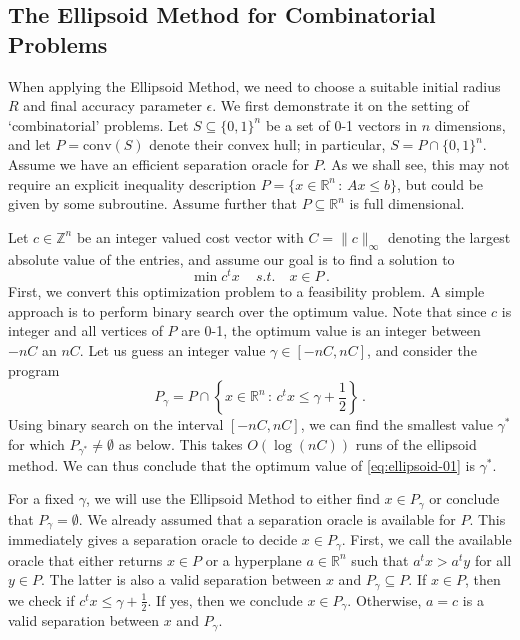 \documentclass[12pt, showidx, twoside]{article}
\def\R{\mathbb{R}}
\begin{document}
{{{\subsection{The Ellipsoid Method for Combinatorial Problems}
When applying the Ellipsoid Method, we need to choose a suitable initial radius $R$ and final accuracy parameter $\epsilon$. We first demonstrate it on the setting of `combinatorial' problems. Let $S\subseteq\{0,1\}^n$ be a set of 0-1 vectors in $n$ dimensions, and let $P=\mathrm{conv}(S)$ denote their convex hull; in particular, $S=P\cap \{0,1\}^n$. Assume we have an efficient separation oracle for $P$. As we shall see, this may not require an explicit inequality description $P=\{x\in\R^n\,:\, Ax\le b\}$, but could be given by some subroutine. 
Assume further that $P\subseteq \R^n$ is full dimensional.

Let $c\in\mathbb{Z}^n$ be an integer valued cost vector with $C=\|c\|_\infty$ denoting the largest absolute value of the entries, and assume our goal is to find a solution to 
\begin{equation}\label{eq:ellipsoid-01}
  \min c^t x\,\quad s.t.\quad x\in P\, .  
\end{equation}
First, we convert this optimization problem to a feasibility problem. A simple approach is to perform binary search over the optimum value. Note that since $c$ is integer and all vertices of $P$ are 0-1, the optimum value is an integer between $-nC$ an $nC$. Let us guess an integer value $\gamma\in [-nC,nC]$, and consider the program
\begin{equation}\label{eq:p-gamma}
    P_{\gamma}=P\cap\left\{x\in\R^n\,:\, c^t x\le \gamma+\frac{1}{2}\right\}\, .
\end{equation}
Using binary search on the interval $[-nC,nC]$, we can find the smallest value $\gamma^*$ for which $P_{\gamma^*}\neq\emptyset$ as below. This takes $O(\log(nC))$ runs of the ellipsoid method. We can thus conclude that the optimum value of \eqref{eq:ellipsoid-01} is $\gamma^*$. 

For a fixed $\gamma$, we will use the Ellipsoid Method to either find $x\in P_{\gamma}$ or conclude that $P_{\gamma}=\emptyset$. We already assumed that a separation oracle is available for $P$. This immediately gives a separation oracle to decide $x\in P_{\gamma}$. First, we call the available oracle that either returns $x\in P$ or a hyperplane $a\in\R^n$ such that $a^t x> a^t y$ for all $y\in P$. The latter is  also a valid separation between $x$ and $P_{\gamma}\subseteq P$. If $x\in P$, then we check if $c^t x\le \gamma+\frac{1}{2}$. If yes, then we conclude $x\in P_{\gamma}$. Otherwise, $a=c$ is a valid separation between $x$ and $P_{\gamma}$.

}}}
\end{document}
